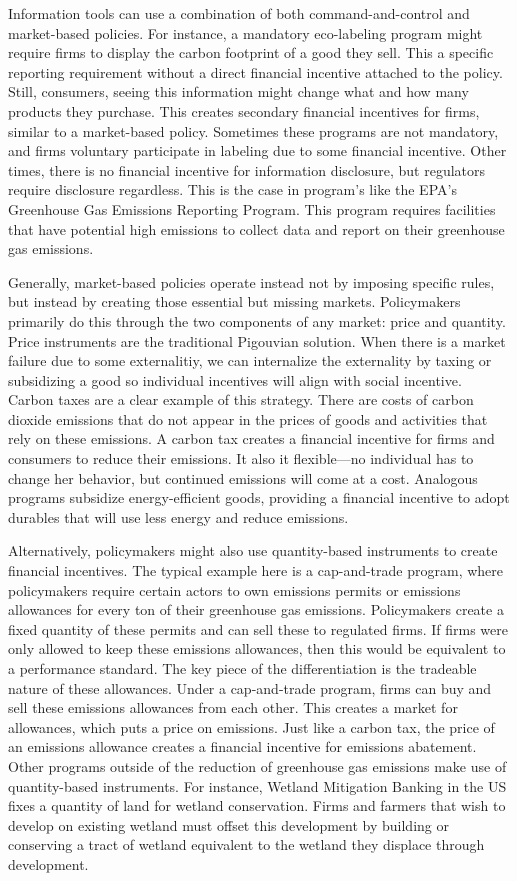 Information tools can use a combination of both command-and-control and market-based policies. For instance, a mandatory eco-labeling program might require firms to display the carbon footprint of a good they sell. This a specific reporting requirement without a direct financial incentive attached to the policy. Still, consumers, seeing this information might change what and how many products they purchase. This creates secondary financial incentives for firms, similar to a market-based policy. Sometimes these programs are not mandatory, and firms  voluntary participate in labeling due to some financial incentive. Other times, there is no financial incentive for information disclosure, but regulators require disclosure regardless. This is the case in program's like the EPA's Greenhouse Gas Emissions Reporting Program. This program requires facilities that have potential high emissions to collect data and report on their greenhouse gas emissions.

Generally, market-based policies operate instead not by imposing specific rules, but instead by creating those essential but missing markets. Policymakers primarily do this through the two components of any market: price and quantity.  Price instruments are the traditional Pigouvian solution. When there is a market failure due to some externalitiy, we can internalize the externality by taxing or subsidizing a good so individual incentives will align with social incentive. Carbon taxes are a clear example of this strategy. There are costs of carbon dioxide emissions that do not appear in the prices of goods and activities that rely on these emissions. A carbon tax creates a financial incentive for firms and consumers to reduce their emissions. It also it flexible---no individual has to change her behavior, but continued emissions will come at a cost.  Analogous programs subsidize energy-efficient goods, providing a financial incentive to adopt durables that will use less energy and reduce emissions. 

Alternatively, policymakers might also use quantity-based instruments to create financial incentives. The typical example here is a cap-and-trade program, where policymakers require certain actors to own emissions permits or emissions allowances for every ton of their greenhouse gas emissions. Policymakers create a fixed quantity of these permits and can sell these to regulated firms. If firms were only allowed to keep these emissions allowances, then this would be equivalent to a performance standard. The key piece of the differentiation is the tradeable nature of these allowances. Under a cap-and-trade program, firms can buy and sell these emissions allowances from each other. This creates a market for allowances, which puts a price on emissions. Just like a carbon tax, the price of an emissions allowance creates a financial incentive for emissions abatement. Other programs outside of the reduction of greenhouse gas emissions make use of quantity-based instruments. For instance, Wetland Mitigation Banking in the US fixes a quantity of land for wetland conservation. Firms and farmers that wish to develop on existing wetland must offset this development by building or conserving a tract of wetland equivalent to the wetland they displace through development. 

